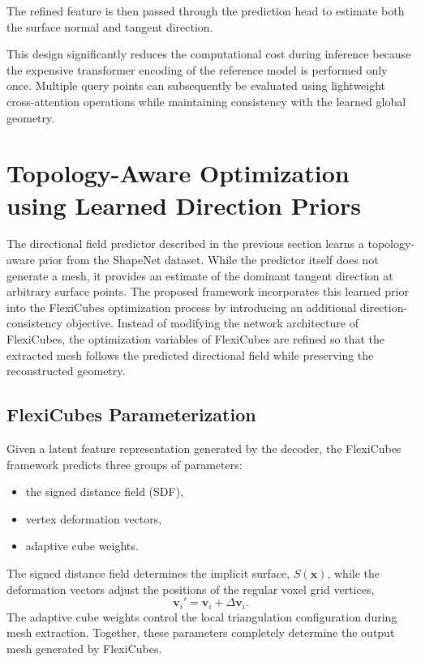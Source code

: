 \documentclass[../main.tex]{subfiles}
\begin{document}
The refined feature is then passed through the prediction head to estimate both the surface normal and tangent direction.

This design significantly reduces the computational cost during inference because the expensive transformer encoding of the reference model is performed only once. Multiple query points can subsequently be evaluated using lightweight cross-attention operations while maintaining consistency with the learned global geometry.


\section{Topology-Aware Optimization using Learned Direction Priors}

The directional field predictor described in the previous section learns a topology-aware prior from the ShapeNet dataset. While the predictor itself does not generate a mesh, it provides an estimate of the dominant tangent direction at arbitrary surface points. The proposed framework incorporates this learned prior into the FlexiCubes optimization process by introducing an additional direction-consistency objective. Instead of modifying the network architecture of FlexiCubes, the optimization variables of FlexiCubes are refined so that the extracted mesh follows the predicted directional field while preserving the reconstructed geometry.

\subsection{FlexiCubes Parameterization}

Given a latent feature representation generated by the decoder, the FlexiCubes framework predicts three groups of parameters:

\begin{itemize}
	\item the signed distance field (SDF),
	\item vertex deformation vectors,
	\item adaptive cube weights.
\end{itemize}

The signed distance field determines the implicit surface, $S(\mathbf{x})$, while the deformation vectors adjust the positions of the regular voxel grid vertices,
\[
\mathbf{v}_i'
=
\mathbf{v}_i+\Delta\mathbf{v}_i.
\]
The adaptive cube weights control the local triangulation configuration during mesh extraction. Together, these parameters completely determine the output mesh generated by FlexiCubes.
\end{document}
